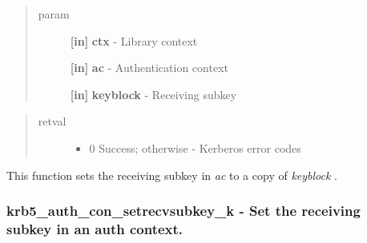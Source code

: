 \documentclass[letterpaper,10pt,english]{sphinxmanual}
\begin{document}
\begin{fulllineitems}
\label{appdev/refs/api/krb5_auth_con_setrecvsubkey:krb5_auth_con_setrecvsubkey}
\end{fulllineitems}

\begin{quote}\begin{description}
\item[{param}] \leavevmode
\textbf{{[}in{]}} \textbf{ctx} - Library context

\textbf{{[}in{]}} \textbf{ac} - Authentication context

\textbf{{[}in{]}} \textbf{keyblock} - Receiving subkey

\end{description}\end{quote}
\begin{quote}\begin{description}
\item[{retval}] \leavevmode\begin{itemize}
\item {} 
0   Success; otherwise - Kerberos error codes

\end{itemize}

\end{description}\end{quote}

This function sets the receiving subkey in \emph{ac} to a copy of \emph{keyblock} .


\subsubsection{krb5\_auth\_con\_setrecvsubkey\_k -  Set the receiving subkey in an auth context.}
\label{appdev/refs/api/krb5_auth_con_setrecvsubkey_k::doc}\label{appdev/refs/api/krb5_auth_con_setrecvsubkey_k:krb5-auth-con-setrecvsubkey-k-set-the-receiving-subkey-in-an-auth-context}

\begin{fulllineitems}
\label{appdev/refs/api/krb5_auth_con_setrecvsubkey_k:krb5_auth_con_setrecvsubkey_k}
\end{fulllineitems}
\end{document}
